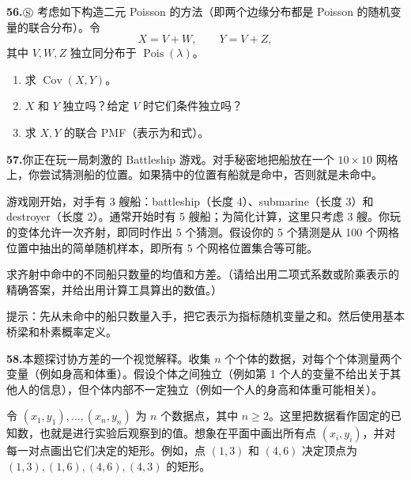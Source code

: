 \documentclass[UTF8, 12pt, fontset=fandol, oneside]{ctexart}
\begin{document}
\noindent\textbf{56.}\quad $\circledS$ 考虑如下构造二元 Poisson 的方法（即两个边缘分布都是 Poisson 的随机变量的联合分布）。令
\[
  X=V+W,\qquad Y=V+Z,
\]
其中 $V,W,Z$ 独立同分布于 $\operatorname{Pois}(\lambda)$。
\begin{enumerate}
  \item[(a)] 求 $\operatorname{Cov}(X,Y)$。
  \item[(b)] $X$ 和 $Y$ 独立吗？给定 $V$ 时它们条件独立吗？
  \item[(c)] 求 $X,Y$ 的联合 PMF（表示为和式）。
\end{enumerate}

\noindent\textbf{57.}\quad 你正在玩一局刺激的 Battleship 游戏。对手秘密地把船放在一个 $10\times 10$ 网格上，你尝试猜测船的位置。如果猜中的位置有船就是命中，否则就是未命中。

游戏刚开始，对手有 3 艘船：battleship（长度 4）、submarine（长度 3）和 destroyer（长度 2）。通常开始时有 5 艘船；为简化计算，这里只考虑 3 艘。你玩的变体允许一次齐射，即同时作出 5 个猜测。假设你的 5 个猜测是从 100 个网格位置中抽出的简单随机样本，即所有 5 个网格位置集合等可能。

求齐射中命中的不同船只数量的均值和方差。（请给出用二项式系数或阶乘表示的精确答案，并给出用计算工具算出的数值。）

提示：先从未命中的船只数量入手，把它表示为指标随机变量之和。然后使用基本桥梁和朴素概率定义。

\noindent\textbf{58.}\quad 本题探讨协方差的一个视觉解释。收集 $n$ 个个体的数据，对每个个体测量两个变量（例如身高和体重）。假设个体之间独立（例如第 1 个人的变量不给出关于其他人的信息），但个体内部不一定独立（例如一个人的身高和体重可能相关）。

令 $(x_1,y_1),\ldots,(x_n,y_n)$ 为 $n$ 个数据点，其中 $n\ge 2$。这里把数据看作固定的已知数，也就是进行实验后观察到的值。想象在平面中画出所有点 $(x_i,y_i)$，并对每一对点画出它们决定的矩形。例如，点 $(1,3)$ 和 $(4,6)$ 决定顶点为 $(1,3),(1,6),(4,6),(4,3)$ 的矩形。
\end{document}
